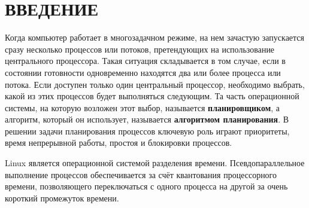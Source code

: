\part*{ВВЕДЕНИЕ}

Когда компьютер работает в многозадачном режиме, на нем зачастую запускается сразу несколько процессов или потоков, претендующих на использование центрального процессора. Такая ситуация складывается в том случае, если в состоянии готовности одновременно находятся два или более процесса или потока. Если доступен только один центральный процессор, необходимо выбрать, какой из этих процессов будет выполняться следующим. Та часть операционной системы, на которую возложен этот выбор, называется \textbf{планировщиком}, а алгоритм, который он использует, называется \textbf{алгоритмом планирования}. В решении задачи планирования процессов ключевую роль играют приоритеты, время непрерывной работы, простоя и блокировки процессов. \cite{tannenbaum}

Linux является операционной системой разделения времени. Псевдопараллельное выполнение процессов обеспечивается за счёт квантования процессорного времени, позволяющего переключаться с одного процесса на другой за очень короткий промежуток времени.

%
%


